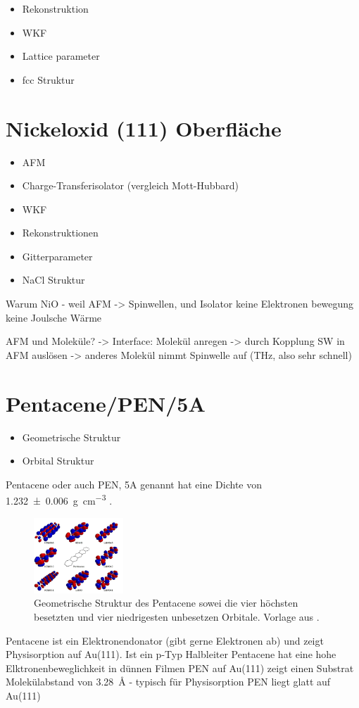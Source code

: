         \begin{itemize}
            \item Rekonstruktion
            \item WKF
            \item Lattice parameter
            \item fcc Struktur
        \end{itemize}


    \section{Nickeloxid (111) Oberfläche}
        \begin{itemize}
            \item AFM
            \item Charge-Transferisolator (vergleich Mott-Hubbard)
            \item WKF
            \item Rekonstruktionen
            \item Gitterparameter
            \item NaCl Struktur
        \end{itemize}
        Warum NiO - weil AFM -> Spinwellen, und Isolator keine Elektronen bewegung keine Joulsche Wärme

        AFM und Moleküle? -> Interface: Molekül anregen -> durch Kopplung SW in AFM auslösen -> anderes Molekül nimmt Spinwelle auf (THz, also sehr schnell)

    \section{Pentacene/PEN/5A}
        \begin{itemize}
            \item Geometrische Struktur
            \item Orbital Struktur
        \end{itemize}
        Pentacene oder auch PEN, 5A genannt hat eine Dichte von \SI{1.232(6)}{\gram\per\cubic\centi\meter} \cite{CAS}.
        \begin{figure}
            \centering
            \includegraphics[width=0.3\textwidth]{./content/PEN.jpg}
            \caption{Geometrische Struktur des Pentacene sowei die vier höchsten besetzten und vier niedrigesten unbesetzen Orbitale. Vorlage aus \cite{PEN}.}
            \label{fig:PEN}
        \end{figure}
        
        \textbf{\cite{5A_1}}
        Pentacene ist ein Elektronendonator (gibt gerne Elektronen ab) und zeigt Physisorption auf Au(111).
        Ist ein p-Typ Halbleiter
        Pentacene hat eine hohe Elktronenbeweglichkeit in dünnen Filmen
        PEN auf Au(111) zeigt einen Substrat Molekülabstand von \SI{3.28}{\angstrom} - typisch für Physisorption
        PEN liegt glatt auf Au(111)
    